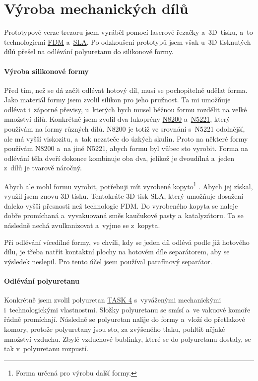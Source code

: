 \newpage
\section{Výroba mechanických dílů}
\label{odlivani}
Prototypové verze trezoru jsem vyráběl pomocí laserové řezačky a~3D~tisku, a~to technologiemi \href{https://www.3dhubs.com/guides/3d-printing/#fdm}{FDM} 
a~\href{https://www.3dhubs.com/guides/3d-printing/#sla-dlp}{SLA}. 
Po odzkoušení prototypů jsem však u~3D tisknutých dílů přešel na odlévání polyuretanu do silikonové formy. 

\paragraph*{Výroba silikonové formy}
Před tím, než se dá začít odlévat hotový díl, musí se pochopitelně udělat forma. 
Jako materiál formy jsem zvolil silikon pro jeho pružnost. 
Ta mi umožňuje odlévat i~záporné převisy, u~kterých bych musel běžnou formu rozdělit na velké množství dílů.
Konkrétně jsem zvolil dva lukoprény \href{https://www.lucebni.cz/cs/lukopren-n/49-silikonovy-kaucuk-lukopren-n-8200.html}{N8200} 
a~\href{https://www.lucebni.cz/cs/lukopren-n/43-silikonovy-kaucuk-lukopren-n-5221.html}{N5221}, který používám na formy různých dílů.
N8200 je totiž ve srovnání s~N5221 odolnější, ale má vyšší viskozitu, a~tak nezateče do úzkých skulin.
Proto na některé formy používám N8200 a~na jiné N5221, abych formu byl vůbec sto vyrobit. 
Forma na odlévání těla dveří dokonce kombinuje oba dva, jelikož je dvoudílná a~jeden z~dílů je tvarově náročný.

Abych ale mohl formu vyrobit, potřebuji mít vyrobené 
kopyto\footnote{Forma určená pro výrobu další formy.} . Abych jej získal, využil jsem znovu 3D tisku.
Tentokráte 3D tisk SLA, který umožňuje dosažení daleko vyšší přesnosti než technologie FDM. %
Do vyrobeného kopyta se naleje dobře promíchaná a~vyvakuovaná směs kaučukové pasty a~katalyzátoru.
Ta se následně nechá zvulkanizovat a~vyjme se z~kopyta.

Při odlévání vícedílné formy, ve chvíli, kdy se jeden díl odlévá podle již hotového dílu, je třeba natřít kontaktní plochy na hotovém díle separátorem, aby se výsledek neslepil.
Pro tento účel jsem používal \href{https://www.lucebni.cz/cs/pomocne-pripravky/54-lukopren-parafinovy-separator.html}{parafínový separátor}.

\paragraph*{Odlévání polyuretanu}
Konkrétně jsem zvolil polyuretan \href{https://www.smooth-on.com/tb/files/TASK_4_TB.pdf}{TASK 4} s~vyvá\-že\-ný\-mi mechanickými i~technologickými vlastnostmi.
Složky polyuretanu se smísí a~ve vakuové komoře řádně promíchají. Následně se polyuretan nalije do formy a~vloží do přetlakové komory,
protože polyuretany jsou sto, za zvýšeného tlaku, pohltit nějaké množství vzduchu.
Zbylé vzduchové bublinky, které se do polyuretanu dostaly, se tak v~polyuretanu rozpustí.